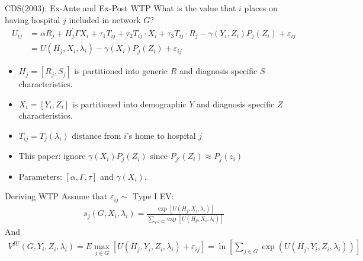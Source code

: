 \documentclass[xcolor=pdftex,dvipsnames,table,mathserif,aspectratio=169]{beamer}
\begin{document}
\begin{frame}{CDS(2003): Ex-Ante and Ex-Post WTP}
What is the value that $i$ places on having hospital $j$ included in network $G$?
\begin{align*}
U_{i j} &=\alpha R_{j}+H_{j}^{\prime} \Gamma X_{i}+\tau_{1} T_{i j}+\tau_{2} T_{i j} \cdot X_{i}+\tau_{3} T_{i j} \cdot R_{j}-\gamma\left(Y_{i}, Z_{i}\right) P_{j}\left(Z_{i}\right)+\varepsilon_{i j} \\ &=U\left(H_{j}, X_{i}, \lambda_{i}\right)-\gamma\left(X_{i}\right) P_{j}\left(Z_{i}\right)+\varepsilon_{i j} 
\end{align*}

\begin{itemize}
\item $H_{j}=\left[R_{j}, S_{j}\right]$ is partitioned into generic $R$ and diagnosis specific $S$ characteristics.
\item $X_{i}=\left[Y_{i}, Z_{i}\right]$ is partitioned into demographic $Y$ and diagnosis specific $Z$ characteristics.
\item $T_{i j}=T_{j}\left(\lambda_{i}\right)$ distance from $i$'s home to hospital $j$
\item This paper: ignore $\gamma\left(X_{i}\right) P_{j}\left(Z_{i}\right)$ since $P_{j'}(Z_i) \approx P_j(z_i)$
\item Parameters: $[\alpha,\Gamma, \tau]$ and $\gamma(X_i)$.
\end{itemize}
\end{frame} 


\begin{frame}{Deriving WTP}
Assume that $\varepsilon_{ij} \sim$ Type I EV:
\begin{align*}
s_{j}\left(G, X_{i}, \lambda_{i}\right)=\frac{\exp \left[U\left(H_{j}, X_{i}, \lambda_{i}\right)\right]}{\sum_{g \in G} \exp \left[U\left(H_{g}, X_{i}, \lambda_{i}\right)\right]}
\end{align*}
And
\begin{align*}
V^{I U}\left(G, Y_{i}, Z_{i}, \lambda_{i}\right)=E \max _{j \in G}\left[U\left(H_{j}, Y_{i}, Z_{i}, \lambda_{i}\right)+\varepsilon_{i j}\right]=\ln \left[\sum_{j \in G} \exp \left(U\left(H_{j}, Y_{i}, Z_{i}, \lambda_{i}\right)\right)\right]
\end{align*}
\end{frame}
\end{document}
